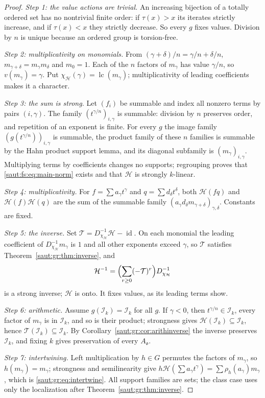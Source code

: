 \documentclass[11pt]{article}
\theoremstyle{definition}
\theoremstyle{remark}
\newcommand{\id}{\operatorname{id}}
\newcommand{\lc}{\operatorname{lc}}
\newcommand{\Ineg}{\mathcal I}
\numberwithin{equation}{section}
\begin{document}
\begin{proof}
\emph{Step 1: the value actions are trivial.} An increasing bijection of a totally
ordered set has no nontrivial finite order: if $\tau(x)>x$ its iterates strictly
increase, and if $\tau(x)<x$ they strictly decrease. So every $g$ fixes values.
Division by $n$ is unique because an ordered group is torsion-free.

\emph{Step 2: multiplicativity on monomials.} From $(\gamma+\delta)/n=\gamma/n+\delta/n$,
$m_{\gamma+\delta}=m_\gamma m_\delta$ and $m_0=1$. Each of the $n$ factors of $m_\gamma$
has value $\gamma/n$, so $v(m_\gamma)=\gamma$. Put $\chi_{\mathcal H}(\gamma)=\lc(m_\gamma)$;
multiplicativity of leading coefficients makes it a character.

\emph{Step 3: the sum is strong.} Let $(f_i)$ be summable and index all nonzero terms by
pairs $(i,\gamma)$. The family $(t^{\gamma/n})_{i,\gamma}$ is summable: division by $n$
preserves order, and repetition of an exponent is finite. For every $g$ the image
family $(g(t^{\gamma/n}))_{i,\gamma}$ is summable, the product family of these $n$
families is summable by the Hahn product support lemma, and its diagonal subfamily
is $(m_\gamma)_{i,\gamma}$. Multiplying terms by coefficients changes no supports;
regrouping proves that \eqref{saut:fs:eq:main-norm} exists and that $\mathcal H$ is
strongly $k$-linear.

\emph{Step 4: multiplicativity.} For $f=\sum a_\gamma t^\gamma$ and $q=\sum d_\delta
t^\delta$, both $\mathcal H(fq)$ and $\mathcal H(f)\mathcal H(q)$ are the sum of the summable
family $(a_\gamma d_\delta m_{\gamma+\delta})_{\gamma,\delta}$. Constants are fixed.

\emph{Step 5: the inverse.} Set $\mathcal T=D_{\chi_{\mathcal H}}^{-1}\mathcal H-\id$. On
each monomial the leading coefficient of $D_{\chi_{\mathcal H}}^{-1}m_\gamma$ is $1$ and
all other exponents exceed $\gamma$, so $\mathcal T$ satisfies
Theorem~\ref{saut:gr:thm:inverse}, and
\begin{equation}\label{saut:gr:eq:Hinv}
 \mathcal H^{-1}=\Bigl(\sum_{r\ge0}(-\mathcal T)^r\Bigr)D_{\chi_{\mathcal H}}^{-1}
\end{equation}
is a strong inverse; $\mathcal H$ is onto. It fixes values, as its leading terms show.

\emph{Step 6: arithmetic.} Assume $g(\Ineg_k)=\Ineg_k$ for all $g$. If $\gamma<0$, then
$t^{\gamma/n}\in\Ineg_k$, every factor of $m_\gamma$ is in $\Ineg_k$, and so is their
product; strongness gives $\mathcal H(\Ineg_k)\subseteq\Ineg_k$, hence
$\mathcal T(\Ineg_k)\subseteq\Ineg_k$. By Corollary~\ref{saut:gr:cor:arithinverse} the
inverse preserves $\Ineg_k$, and fixing $k$ gives preservation of every
$A_{\mathfrak o}$.

\emph{Step 7: intertwining.} Left multiplication by $h\in G$ permutes the factors of
$m_\gamma$, so $h(m_\gamma)=m_\gamma$; strongness and semilinearity give
$h\mathcal H(\sum a_\gamma t^\gamma)=\sum\rho_h(a_\gamma)m_\gamma$, which is
\eqref{saut:gr:eq:intertwine}. All support families are sets; the class case uses only
the localization after Theorem~\ref{saut:gr:thm:inverse}.
\end{proof}
\end{document}
